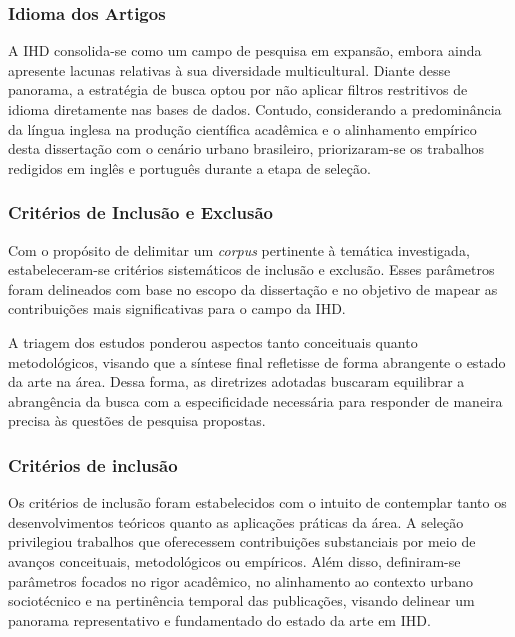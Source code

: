 \documentclass[
	12pt,				%
	oneside,			%
	a4paper,			%
	english,			%
	brazil				%
	]{abntex2ppgsi}
\begin{document}
   \subsubsection{Idioma dos Artigos}

    A IHD consolida-se como um campo de pesquisa em expansão, embora ainda apresente lacunas relativas à sua diversidade multicultural. Diante desse panorama, a estratégia de busca optou por não aplicar filtros restritivos de idioma diretamente nas bases de dados. Contudo, considerando a predominância da língua inglesa na produção científica acadêmica e o alinhamento empírico desta dissertação com o cenário urbano brasileiro, priorizaram-se os trabalhos redigidos em inglês e português durante a etapa de seleção.

    \subsubsection{Critérios de Inclusão e Exclusão}

    Com o propósito de delimitar um \textit{corpus} pertinente à temática investigada, estabeleceram-se critérios sistemáticos de inclusão e exclusão. Esses parâmetros foram delineados com base no escopo da dissertação e no objetivo de mapear as contribuições mais significativas para o campo da IHD.

    A triagem dos estudos ponderou aspectos tanto conceituais quanto metodológicos, visando que a síntese final refletisse de forma abrangente o estado da arte na área. Dessa forma, as diretrizes adotadas buscaram equilibrar a abrangência da busca com a especificidade necessária para responder de maneira precisa às questões de pesquisa propostas.

    \subsubsection{Critérios de inclusão}\label{crit:Inclu}
    
    Os critérios de inclusão foram estabelecidos com o intuito de contemplar tanto os desenvolvimentos teóricos quanto as aplicações práticas da área. A seleção privilegiou trabalhos que oferecessem contribuições substanciais por meio de avanços conceituais, metodológicos ou empíricos. Além disso, definiram-se parâmetros focados no rigor acadêmico, no alinhamento ao contexto urbano sociotécnico e na pertinência temporal das publicações, visando delinear um panorama representativo e fundamentado do estado da arte em IHD.
    
\end{document}
